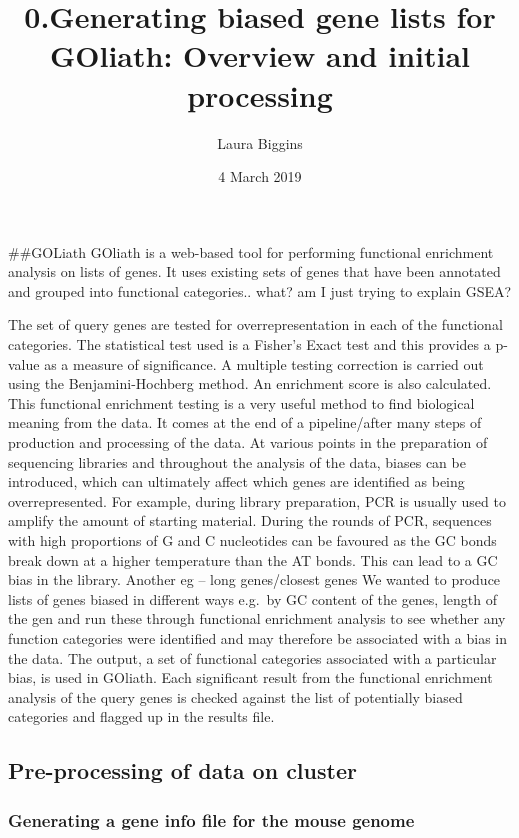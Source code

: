 \documentclass[]{article}
\title{0.Generating biased gene lists for GOliath: Overview and initial
processing}
\author{Laura Biggins}
\date{4 March 2019}
\begin{document}
\maketitle

\#\#GOLiath GOliath is a web-based tool for performing functional
enrichment analysis on lists of genes. It uses existing sets of genes
that have been annotated and grouped into functional categories.. what?
am I just trying to explain GSEA?

The set of query genes are tested for overrepresentation in each of the
functional categories. The statistical test used is a Fisher's Exact
test and this provides a p-value as a measure of significance. A
multiple testing correction is carried out using the Benjamini-Hochberg
method. An enrichment score is also calculated. This functional
enrichment testing is a very useful method to find biological meaning
from the data. It comes at the end of a pipeline/after many steps of
production and processing of the data. At various points in the
preparation of sequencing libraries and throughout the analysis of the
data, biases can be introduced, which can ultimately affect which genes
are identified as being overrepresented. For example, during library
preparation, PCR is usually used to amplify the amount of starting
material. During the rounds of PCR, sequences with high proportions of G
and C nucleotides can be favoured as the GC bonds break down at a higher
temperature than the AT bonds. This can lead to a GC bias in the
library. Another eg -- long genes/closest genes We wanted to produce
lists of genes biased in different ways e.g.~by GC content of the genes,
length of the gen and run these through functional enrichment analysis
to see whether any function categories were identified and may therefore
be associated with a bias in the data. The output, a set of functional
categories associated with a particular bias, is used in GOliath. Each
significant result from the functional enrichment analysis of the query
genes is checked against the list of potentially biased categories and
flagged up in the results file.

\hypertarget{pre-processing-of-data-on-cluster}{%
\subsection{Pre-processing of data on
cluster}\label{pre-processing-of-data-on-cluster}}

\hypertarget{generating-a-gene-info-file-for-the-mouse-genome}{%
\subsubsection{Generating a gene info file for the mouse
genome}\label{generating-a-gene-info-file-for-the-mouse-genome}}
\end{document}
